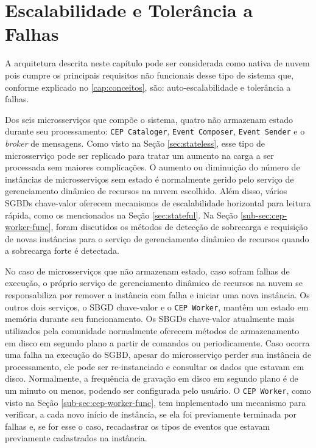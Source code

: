 

\section{Escalabilidade e Tolerância a Falhas}

A arquitetura descrita neste capítulo pode ser considerada como nativa de nuvem pois cumpre os principais requisitos não funcionais desse tipo de sistema que, conforme explicado no \ref{cap:conceitos}, são: auto-escalabilidade e tolerância a falhas.


Dos seis microsserviços que compõe o sistema, quatro não armazenam estado durante seu processamento: \texttt{CEP Cataloger}, \texttt{Event Composer}, \texttt{Event Sender} e o \textit{broker} de mensagens. Como visto na Seção \ref{sec:stateless}, esse tipo de microsserviço pode ser replicado para tratar um aumento na carga a ser processada sem maiores complicações. O aumento ou diminuição do número de instâncias de microsserviços sem estado é normalmente gerido pelo serviço de gerenciamento dinâmico de recursos na nuvem escolhido. Além disso, vários SGBDs chave-valor oferecem mecanismos de escalabilidade horizontal para leitura rápida, como os mencionados na Seção \ref{sec:stateful}. Na Seção \ref{sub-sec:cep-worker-func}, foram discutidos os métodos de detecção de sobrecarga e requisição de novas instâncias para o serviço de gerenciamento dinâmico de recursos quando a sobrecarga forte é detectada. 


No caso de microsserviços que não armazenam estado, caso sofram falhas de execução, o próprio serviço de gerenciamento dinâmico de recursos na nuvem se responsabiliza por remover a instância com falha e iniciar uma nova instância. Os outros dois serviços, o SBGD chave-valor e o \texttt{CEP Worker}, mantêm um estado em memória durante seu funcionamento. Os SBGDs chave-valor atualmente mais utilizados pela comunidade normalmente oferecem métodos de armazenamento em disco em segundo plano a partir de comandos ou periodicamente. Caso ocorra uma falha na execução do SGBD, apesar do microsserviço perder sua instância de processamento, ele pode ser re-instanciado e consultar os dados que estavam em disco. Normalmente, a frequência de gravação em disco em segundo plano é de um minuto ou menos, podendo ser configurada pelo usuário. O \texttt{CEP Worker}, como visto na Seção \ref{sub-sec:cep-worker-func}, tem implementado um mecanismo para verificar, a cada novo início de instância, se ela foi previamente terminada por falhas e, se for esse o caso, recadastrar os tipos de eventos que estavam previamente cadastrados na instância.

